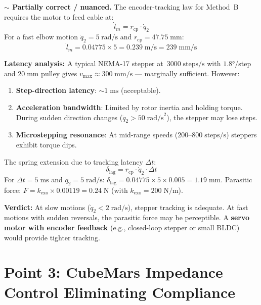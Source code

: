 \documentclass[11pt, a4paper]{article}
\newenvironment{nuanced}{%
  \begin{mdframed}[backgroundcolor=yellow!10, linecolor=orange!60!black]%
  \textbf{\color{orange!60!black}$\sim$\; Partially correct / nuanced.}\;}{\end{mdframed}}
\begin{document}
\begin{nuanced}
The encoder-tracking law for Method~B requires the motor to feed cable at:
%
\begin{equation}
  \dot{l}_m = r_{\text{cp}} \cdot \dot{q}_2
\end{equation}
%
For a fast elbow motion $\dot{q}_2 = 5\;\text{rad/s}$ and
$r_{\text{cp}} = 47.75\;\text{mm}$:
%
\[
  \dot{l}_m = 0.04775 \times 5 = 0.239\;\text{m/s}
  = 239\;\text{mm/s}
\]

\noindent
\textbf{Latency analysis:}
A typical NEMA-17 stepper at~$3000\;\text{steps/s}$ with $1.8°$/step and
$20\;\text{mm}$ pulley gives
$v_{\max} \approx 300\;\text{mm/s}$ --- marginally sufficient.  However:

\begin{enumerate}[nosep]
  \item \textbf{Step-direction latency}: $\sim 1\;\text{ms}$ (acceptable).
  \item \textbf{Acceleration bandwidth}: Limited by rotor inertia and
    holding torque.  During sudden direction changes
    ($\ddot{q}_2 > 50\;\text{rad/s}^2$), the stepper may lose steps.
  \item \textbf{Microstepping resonance}: At mid-range speeds
    ($200$--$800\;\text{steps/s}$) steppers exhibit torque dips.
\end{enumerate}

\noindent
The spring extension due to tracking latency $\Delta t$:
\begin{equation}\label{eq:spring-lag}
  \delta_{\text{lag}} = r_{\text{cp}} \cdot \dot{q}_2 \cdot \Delta t
\end{equation}
For $\Delta t = 5\;\text{ms}$ and $\dot{q}_2 = 5\;\text{rad/s}$:
$\delta_{\text{lag}} = 0.04775 \times 5 \times 0.005 = 1.19\;\text{mm}$.
Parasitic force: $F = k_{\text{exo}} \times 0.00119 = 0.24\;\text{N}$
(with $k_{\text{exo}} = 200\;\text{N/m}$).

\medskip\noindent
\textbf{Verdict:} At slow motions ($\dot{q}_2 < 2\;\text{rad/s}$), stepper
tracking is adequate.  At fast motions with sudden reversals, the parasitic
force may be perceptible.  A \textbf{servo motor with encoder feedback}
(e.g., closed-loop stepper or small BLDC) would provide tighter tracking.
\end{nuanced}


\section{Point 3: CubeMars Impedance Control Eliminating Compliance}
\label{sec:point3}
\end{document}
